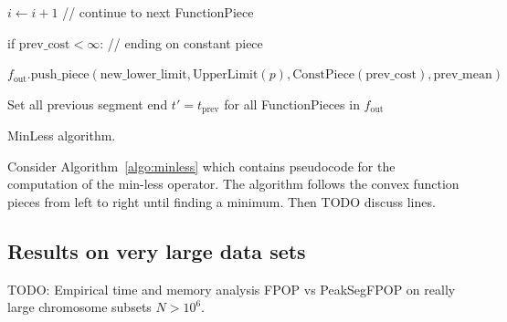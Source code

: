 \documentclass{article}
\begin{document}
\begin{algorithm}[H]
\begin{algorithmic}[1]
\begin{ALC@g}
\begin{ALC@g}
\begin{ALC@g}
      \STATE $i\gets i+1$ // continue to next FunctionPiece
    \end{ALC@g}
  \end{ALC@g}
\end{ALC@g}
  \STATE if $\text{prev\_cost} < \infty$: // ending on constant piece
  \begin{ALC@g}
    \STATE $f_{\text{out}}\text{.push\_piece}(
    \text{new\_lower\_limit}, 
    \text{UpperLimit}(p), 
    \text{ConstPiece}(\text{prev\_cost}), 
    \text{prev\_mean})$
  \end{ALC@g}
\STATE Set all previous segment end $t'=t_{\text{prev}}$  for all FunctionPieces in $f_{\text{out}}$
\caption{\label{algo:minless}MinLess algorithm.}
\end{algorithmic}
\end{algorithm}

Consider Algorithm~\ref{algo:minless} which contains pseudocode for
the computation of the min-less operator. The algorithm follows the
convex function pieces from left to right until finding a
minimum. Then TODO discuss lines.

\subsection{Results on very large data sets}

TODO: Empirical time and memory analysis FPOP vs PeakSegFPOP on really
large chromosome subsets $N>10^6$.
\end{document}
